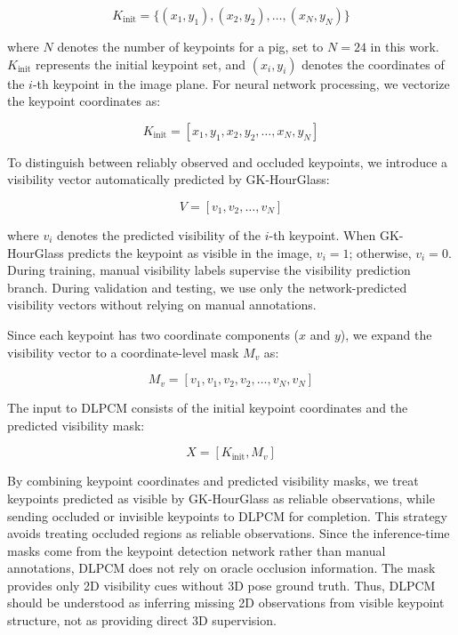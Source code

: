 \documentclass[computers,article,submit,pdftex,moreauthors]{mdpi}
\begin{document}
\begin{equation}
K_{\text{init}} = \{(x_1, y_1), (x_2, y_2), \ldots, (x_N, y_N)\}
\end{equation}

where $N$ denotes the number of keypoints for a pig, set to $N = 24$ in this work. $K_{\text{init}}$ represents the initial keypoint set, and $(x_i, y_i)$ denotes the coordinates of the $i$-th keypoint in the image plane. For neural network processing, we vectorize the keypoint coordinates as:

\begin{equation}
K_{\text{init}} = [x_1, y_1, x_2, y_2, \ldots, x_N, y_N]
\end{equation}

To distinguish between reliably observed and occluded keypoints, we introduce a visibility vector automatically predicted by GK-HourGlass:

\begin{equation}
V = [v_1, v_2, \ldots, v_N]
\end{equation}

where $v_i$ denotes the predicted visibility of the $i$-th keypoint. When GK-HourGlass predicts the keypoint as visible in the image, $v_i = 1$; otherwise, $v_i = 0$. During training, manual visibility labels supervise the visibility prediction branch. During validation and testing, we use only the network-predicted visibility vectors without relying on manual annotations.

Since each keypoint has two coordinate components ($x$ and $y$), we expand the visibility vector to a coordinate-level mask $M_v$ as:

\begin{equation}
M_v = [v_1, v_1, v_2, v_2, \ldots, v_N, v_N]
\end{equation}

The input to DLPCM consists of the initial keypoint coordinates and the predicted visibility mask:

\begin{equation}
X = [K_{\text{init}}, M_v]
\end{equation}

By combining keypoint coordinates and predicted visibility masks, we treat keypoints predicted as visible by GK-HourGlass as reliable observations, while sending occluded or invisible keypoints to DLPCM for completion. This strategy avoids treating occluded regions as reliable observations. Since the inference-time masks come from the keypoint detection network rather than manual annotations, DLPCM does not rely on oracle occlusion information. The mask provides only 2D visibility cues without 3D pose ground truth. Thus, DLPCM should be understood as inferring missing 2D observations from visible keypoint structure, not as providing direct 3D supervision.
\end{document}

